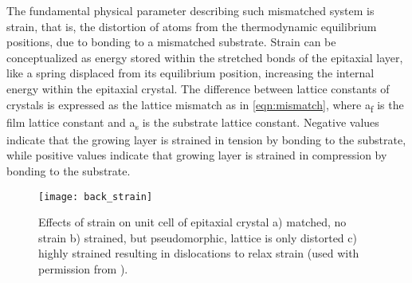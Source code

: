 The fundamental physical parameter describing such mismatched system is strain, that is, the distortion of atoms from the thermodynamic equilibrium positions, due to bonding to a mismatched substrate.
Strain can be conceptualized as energy stored within the stretched bonds of the epitaxial layer, like a spring displaced from its equilibrium position, increasing the internal energy within the epitaxial crystal. The difference between lattice constants of crystals is expressed as the lattice mismatch as in \cref{eqn:mismatch}, where a\textsubscript{f} is the film lattice constant and a\textsubscript{s} is the substrate lattice constant.
Negative values indicate that the growing layer is strained in tension by bonding to the substrate, while positive values indicate that growing layer is strained in compression by bonding to the substrate.
\begin{figure}
 \centering \texttt{[image: back\_strain]}
 \caption[Unit cell strain visualization]{\label{fig:back_strain}Effects of strain on unit cell of epitaxial crystal a) matched, no strain b) strained, but pseudomorphic, lattice is only distorted c) highly strained resulting in dislocations to relax strain (used with permission from \cite{ohring2001materials}).}
\end{figure}

